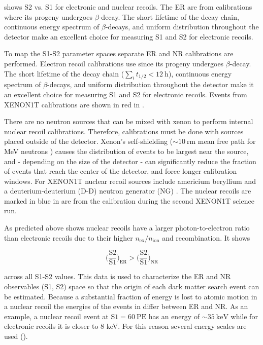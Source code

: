  shows S2 vs. S1 for electronic and nuclear recoils.  The ER are from  calibrations
where its progeny  undergoes $\beta$-decay.  The short lifetime of the  decay chain, continuous energy spectrum
of $\beta$-decays, and uniform distribution throughout the detector make  an excellent choice for measuring S1 and S2 for
electronic recoils.

To map the S1-S2 parameter spaces separate ER and NR calibrations are performed.  Electron recoil calibrations use  since
its progeny  undergoes $\beta$-decay.  The short lifetime of the  decay chain
($\sum_i t_{1/2} < 12\ \mathrm{h}$), continuous energy spectrum
of $\beta$-decays, and uniform distribution throughout the detector make it an excellent choice for measuring S1 and S2 for
electronic recoils.  Events from XENON1T calibrations are shown in red in .

There are no neutron sources that can be mixed with xenon to perform internal nuclear recoil calibrations.  Therefore, calibrations
must be done with sources placed outside of the detector.  Xenon's self-shielding (${\sim}10\ \mathrm{rm}$ mean free path for MeV
neutrons ) causes the distribution of events to be largest near
the source, and - depending on the size of the detector - can significantly reduce the fraction of events that reach the center of the
detector, and force longer calibration windows.  For XENON1T nuclear recoil sources include
americium beryllium  and a deuterium-deuterium (D-D) neutron generator (NG) .  The nuclear recoils are
marked in blue in  are from the \ambe calibration during the second XENON1T science run.

As predicted above  shows nuclear recoils have a larger photon-to-electron ratio than electronic recoils due
to their higher $n_{\mathrm{ex}}/n_{\mathrm{ion}}$ and recombination.  It shows

\begin{equation}
\bigg( \frac{\mathrm{S}2}{\mathrm{S}1} \bigg)_{\mathrm{ER}} > \bigg( \frac{\mathrm{S}2}{\mathrm{S}1} \bigg)_{\mathrm{NR}}
\end{equation}

\noindent across all S1-S2 values.  This data is used to characterize the ER and NR observables (S1, S2) space so that the origin of each
dark
matter search event can be estimated.  Because a substantial fraction of energy is lost to atomic motion in a nuclear recoil the energies
of the events in  differ between ER and NR.  As an example, a nuclear recoil event at
$\mathrm{S1} = 60\ \mathrm{PE}$ has an energy of ${\sim}35\ \mathrm{keV}$ while for electronic recoils it is closer to 8 keV.  For this
reason several energy scales are used ().

